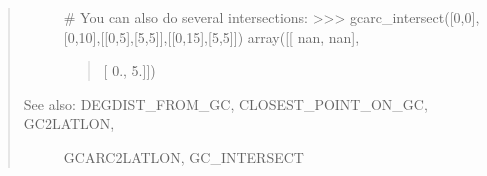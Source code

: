 \documentclass[letterpaper,10pt,english]{sphinxmanual}
\begin{document}
\begin{fulllineitems}
\begin{quote}
\begin{description}
\# You can also do several intersections:
\textgreater{}\textgreater{}\textgreater{} gcarc\_intersect({[}0,0{]},{[}0,10{]},{[}{[}0,5{]},{[}\sphinxhyphen{}5,5{]}{]},{[}{[}0,15{]},{[}5,5{]}{]})
array({[}{[} nan,  nan{]},
\begin{quote}

{[} \sphinxhyphen{}0.,   5.{]}{]})
\end{quote}

\item[{See also: DEGDIST\_FROM\_GC, CLOSEST\_POINT\_ON\_GC, GC2LATLON,}] \leavevmode
GCARC2LATLON, GC\_INTERSECT

\end{description}
\end{quote}

\end{fulllineitems}

\end{document}
